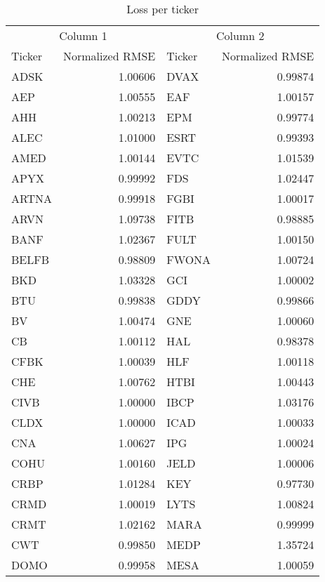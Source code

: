 \begin{table}[H]
\centering
\caption{Loss per ticker}
\label{tab:appendix_B}
\begin{tabular}{l r l r}
\toprule
\multicolumn{2}{c}{Column 1} & \multicolumn{2}{c}{Column 2} \\
\cmidrule(r){1-2} \cmidrule(r){3-4}
Ticker & Normalized RMSE & Ticker & Normalized RMSE \\
\midrule
ADSK & 1.00606 & DVAX & 0.99874 \\
AEP & 1.00555 & EAF & 1.00157 \\
AHH & 1.00213 & EPM & 0.99774 \\
ALEC & 1.01000 & ESRT & 0.99393 \\
AMED & 1.00144 & EVTC & 1.01539 \\
APYX & 0.99992 & FDS & 1.02447 \\
ARTNA & 0.99918 & FGBI & 1.00017 \\
ARVN & 1.09738 & FITB & 0.98885 \\
BANF & 1.02367 & FULT & 1.00150 \\
BELFB & 0.98809 & FWONA & 1.00724 \\
BKD & 1.03328 & GCI & 1.00002 \\
BTU & 0.99838 & GDDY & 0.99866 \\
BV & 1.00474 & GNE & 1.00060 \\
CB & 1.00112 & HAL & 0.98378 \\
CFBK & 1.00039 & HLF & 1.00118 \\
CHE & 1.00762 & HTBI & 1.00443 \\
CIVB & 1.00000 & IBCP & 1.03176 \\
CLDX & 1.00000 & ICAD & 1.00033 \\
CNA & 1.00627 & IPG & 1.00024 \\
COHU & 1.00160 & JELD & 1.00006 \\
CRBP & 1.01284 & KEY & 0.97730 \\
CRMD & 1.00019 & LYTS & 1.00824 \\
CRMT & 1.02162 & MARA & 0.99999 \\
CWT & 0.99850 & MEDP & 1.35724 \\
DOMO & 0.99958 & MESA & 1.00059 \\
\bottomrule
\end{tabular}
\end{table}
